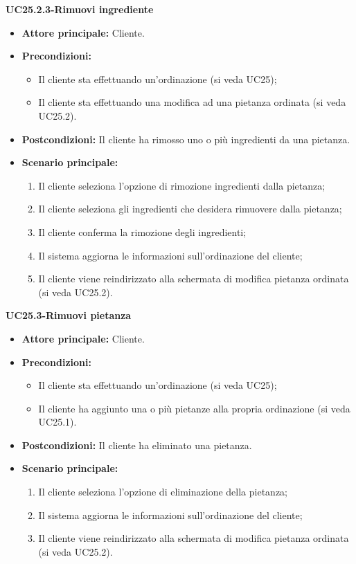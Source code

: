 \textbf{UC25.2.3-Rimuovi ingrediente}
\begin{itemize}
\item \textbf{Attore principale:} Cliente.
\item \textbf{Precondizioni:}
\begin{itemize}
    \item Il cliente sta effettuando un'ordinazione (si veda UC25);
    \item Il cliente sta effettuando una modifica ad una pietanza ordinata (si veda UC25.2).
\end{itemize}
\item \textbf{Postcondizioni:} Il cliente ha rimosso uno o più ingredienti da una pietanza.
\item \textbf{Scenario principale:}
\begin{enumerate}
    \item Il cliente seleziona l'opzione di rimozione ingredienti dalla pietanza;
    \item Il cliente seleziona gli ingredienti che desidera rimuovere dalla pietanza;
    \item Il cliente conferma la rimozione degli ingredienti;
    \item Il sistema aggiorna le informazioni sull'ordinazione del cliente;
    \item Il cliente viene reindirizzato alla schermata di modifica pietanza ordinata (si veda UC25.2).
\end{enumerate}
\end{itemize}

\textbf{UC25.3-Rimuovi pietanza}
\begin{itemize}
\item \textbf{Attore principale:} Cliente.
\item \textbf{Precondizioni:}
\begin{itemize}
    \item Il cliente sta effettuando un'ordinazione (si veda UC25);
    \item Il cliente ha aggiunto una o più pietanze alla propria ordinazione (si veda UC25.1).
\end{itemize}
\item \textbf{Postcondizioni:} Il cliente ha eliminato una pietanza.
\item \textbf{Scenario principale:}
\begin{enumerate}
    \item Il cliente seleziona l'opzione di eliminazione della pietanza;
    \item Il sistema aggiorna le informazioni sull'ordinazione del cliente;
    \item Il cliente viene reindirizzato alla schermata di modifica pietanza ordinata (si veda UC25.2).
\end{enumerate}
\end{itemize}

